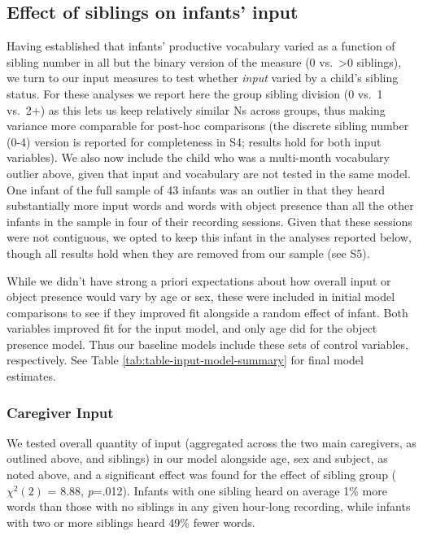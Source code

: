 \documentclass[
  man,mask,floatsintext]{apa6}
\begin{document}
\hypertarget{effect-of-siblings-on-infants-input}{%
\subsection{Effect of siblings on infants' input}\label{effect-of-siblings-on-infants-input}}

Having established that infants' productive vocabulary varied as a function of sibling number in all but the binary version of the measure (0 vs.~\textgreater0 siblings), we turn to our input measures to test whether \emph{input} varied by a child's sibling status. For these analyses we report here the group sibling division (0 vs.~1 vs.~2+) as this lets us keep relatively similar Ns across groups, thus making variance more comparable for post-hoc comparisons (the discrete sibling number (0-4) version is reported for completeness in S4; results hold for both input variables). We also now include the child who was a multi-month vocabulary outlier above, given that input and vocabulary are not tested in the same model. One infant of the full sample of 43 infants was an outlier in that they heard substantially more input words and words with object presence than all the other infants in the sample in four of their recording sessions. Given that these sessions were not contiguous, we opted to keep this infant in the analyses reported below, though all results hold when they are removed from our sample (see S5).

While we didn't have strong a priori expectations about how overall input or object presence would vary by age or sex, these were included in initial model comparisons to see if they improved fit alongside a random effect of infant. Both variables improved fit for the input model, and only age did for the object presence model. Thus our baseline models include these sets of control variables, respectively. See Table \ref{tab:table-input-model-summary} for final model estimates.

\hypertarget{caregiver-input}{%
\subsubsection{Caregiver Input}\label{caregiver-input}}

We tested overall quantity of input (aggregated across the two main caregivers, as outlined above, and siblings) in our model alongside age, sex and subject, as noted above, and a significant effect was found for the effect of sibling group (\(\chi^2 (2)\) = 8.88, \emph{p}=.012). Infants with one sibling heard on average 1\% more words than those with no siblings in any given hour-long recording, while infants with two or more siblings heard 49\% fewer words.
\end{document}
